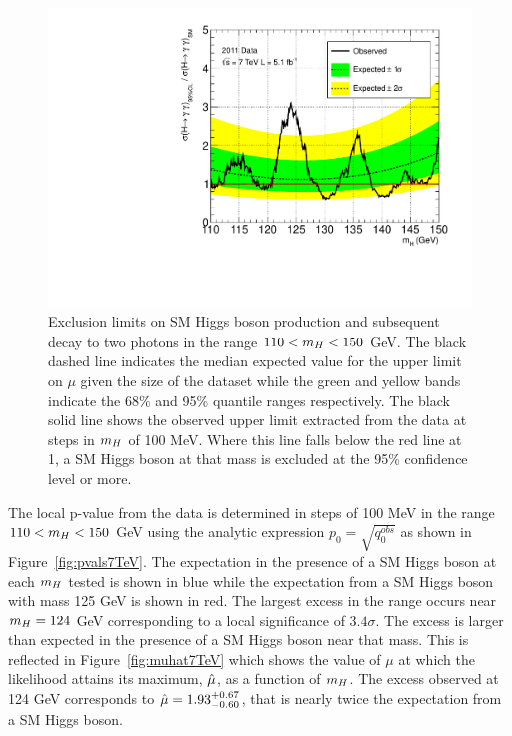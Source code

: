 \begin{figure}
\begin{center}
  \includegraphics[width=.8\textwidth]{hgg7TeV/statsPlots/limit-100MeV.pdf}
\end{center}
 \caption{Exclusion limits on SM Higgs boson production and subsequent decay to two photons in the range
 $110 < m_{H} < 150$ GeV. The black dashed line indicates the median expected value for the upper limit on $\mu$
 given the size of the dataset while the green and yellow bands indicate the 68\% and 95\% quantile ranges 
 respectively.
 The black solid line shows the observed upper limit extracted from the data at steps in $m_{H}$ of 100 MeV. 
 Where this line falls below the red line at 1, a SM Higgs boson at that mass is excluded at the 95\% confidence level or more.}
\label{fig:limits7TeV}
\end{figure}

The local p-value from the data is determined in steps of 100 MeV in the range $110 < m_{H} < 150 $ GeV
using the analytic expression $p_{0} = \sqrt{q_{0}^{obs}}$
as shown in Figure~\ref{fig:pvals7TeV}. The expectation in the presence of a SM Higgs boson at each $m_{H}$ tested
is shown in blue while the expectation from a SM Higgs boson with mass 125 GeV is shown in red. 
The largest excess in the range occurs near $m_{H}=124$ GeV corresponding
to a local significance of $3.4\sigma$. The excess is larger than expected in the presence of a SM 
Higgs boson near that mass. This is reflected in Figure~\ref{fig:muhat7TeV} which shows the value of 
$\mu$ at which the likelihood attains its maximum, $\hat{\mu}$, as a function of $m_{H}$. 
The excess observed at 124 GeV corresponds to $\hat{\mu}=1.93^{+0.67}_{-0.60}$, that is nearly twice 
the expectation from a SM Higgs boson.

